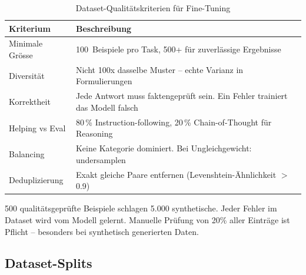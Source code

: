 \begin{table}[H]
\centering
\begin{tabularx}{\linewidth}{lX}
\toprule
\textbf{Kriterium} & \textbf{Beschreibung} \\
\midrule
Minimale Grösse & 100~Beispiele pro Task, 500+ für zuverlässige Ergebnisse \\
Diversität & Nicht 100x dasselbe Muster -- echte Varianz in Formulierungen \\
Korrektheit & Jede Antwort muss faktengeprüft sein. Ein Fehler trainiert das Modell falsch \\
Helping vs Eval & 80\,\% Instruction-following, 20\,\% Chain-of-Thought für Reasoning \\
Balancing & Keine Kategorie dominiert. Bei Ungleichgewicht: undersamplen \\
Deduplizierung & Exakt gleiche Paare entfernen (Levenshtein-Ähnlichkeit $>$ 0.9) \\
\bottomrule
\end{tabularx}
\caption{Dataset-Qualitätskriterien für Fine-Tuning}
\label{tab:dataset-quality}
\end{table}

\begin{praxishinweis}
500 qualitätsgeprüfte Beispiele schlagen 5.000 synthetische. Jeder Fehler im Dataset wird vom Modell gelernt. Manuelle Prüfung von 20\% aller Einträge ist Pflicht -- besonders bei synthetisch generierten Daten.
\end{praxishinweis}

\subsection{Dataset-Splits}

